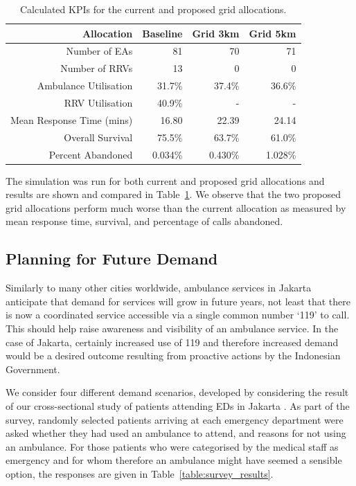 \documentclass[preprint,12pt]{elsarticle}
\begin{document}
\begin{table} \begin{center} \begin{tabular}{rrrr} \toprule Allocation &
    Baseline & Grid 3km & Grid 5km \\ \midrule Number of EAs & 81 & 70 & 71 \\
    Number of RRVs & 13 & 0 & 0 \\ Ambulance Utilisation & 31.7\% & 37.4\% &
    36.6\% \\ RRV Utilisation & 40.9\% & - & - \\ Mean Response Time (mins) &
    16.80 & 22.39 & 24.14 \\ Overall Survival & 75.5\% & 63.7\% & 61.0\% \\
    Percent Abandoned & 0.034\% & 0.430\% & 1.028\% \\ \bottomrule \end{tabular}
    \caption{Calculated KPIs for the current and proposed grid allocations.}
    \label{tbl:current_grid_results} \end{center} \end{table}

The simulation was run for both current  and proposed grid allocations and
results are shown and compared in Table~\ref{tbl:current_grid_results}.  We
observe that the two proposed grid allocations perform much worse than the
current allocation as measured by mean response time, survival, and percentage
of calls abandoned.

\subsection{Planning for Future Demand}\label{sec:demand_scenarios} Similarly to
many other cities worldwide, ambulance services in Jakarta anticipate that
demand for services will grow in future years, not least that there is now a
coordinated service accessible via a single common number `119' to call. This
should help raise awareness and visibility of an ambulance service. In the case
of Jakarta, certainly increased use of 119 and therefore increased demand would
be a desired outcome resulting from proactive actions by the Indonesian
Government. 

We consider four different demand scenarios, developed by considering the result
of our cross-sectional study of patients attending EDs in Jakarta
\cite{BriceSyaribahNoor2022Esui}. As part of the survey, randomly selected
patients arriving at each emergency department were asked whether they had used
an ambulance to attend, and reasons for not using an ambulance. For those
patients who were categorised by the medical staff as emergency and for whom
therefore an ambulance might have seemed a sensible option, the responses are
given in Table~\ref{table:survey_results}.
\end{document}
